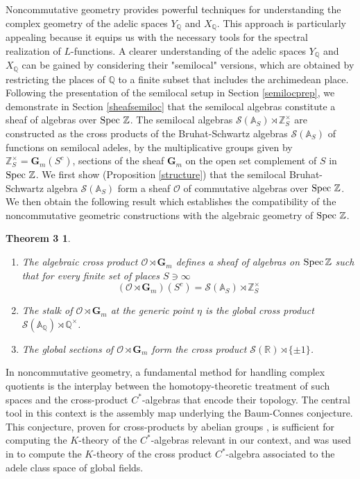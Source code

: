 \documentclass[letterpaper,11pt]{article}
\def\Spec{{\rm Spec\,}}
\def\A{{\mathbb A}}
\def\Q{{\mathbb Q}}
\def\R{\mathbb{R}}
\def\Z{\mathbb{Z}}
\def\cS{\mathcal{S}}
\def\sheaf{{\mathscr{O} }}
\theoremstyle{plain}
\newtheorem*{theorem3}{Theorem 3}
\begin{document}
Noncommutative geometry provides powerful techniques for understanding the complex geometry of the adelic spaces $ Y_\mathbb{Q} $ and $ X_\mathbb{Q} $. This approach is particularly appealing because it equips us with the necessary tools for the spectral realization of $L$-functions. A clearer understanding of the adelic spaces $ Y_\mathbb{Q} $ and $ X_\mathbb{Q} $ can be gained by considering their "semilocal" versions, which are obtained by restricting the places of $ \mathbb{Q} $ to a finite subset that includes the archimedean place.  
Following the presentation of the semilocal setup in Section \ref{semilocprep}, we demonstrate in Section \ref{sheafsemiloc} that the semilocal algebras constitute a sheaf of algebras over $\Spec\,\Z$. The semilocal algebras $\cS(\A_S)\rtimes \Z_S^\times$ are constructed as the cross products of the Bruhat-Schwartz algebras $\cS(\A_S)$ of functions on semilocal adeles, by the multiplicative groups given by $\Z_S^\times=\mathbf{G}_m(S^c)$, sections of the sheaf $\mathbf{G}_m$ on the open set complement of $S$ in $\Spec\,\Z$. We first show (Proposition \ref{structure}) that the semilocal Bruhat-Schwartz algebra $\cS(\A_S)$ form a sheaf $\sheaf$ of commutative algebras over $\Spec\,\Z$. We then obtain the following result which establishes the compatibility of the noncommutative geometric constructions with the algebraic geometry of $\Spec\,\Z$. 
\begin{theorem3}	
\label{structure1intro}  
 		\begin{enumerate}
 			\item The algebraic cross product $\sheaf\rtimes \mathbf{G}_m$ defines a sheaf  of algebras on  $\Spec\Z$ such that for every finite set of places $S\ni \infty$
 			$$
 			\left(\sheaf\rtimes \mathbf{G}_m\right)(S^c)=\cS(\A_S)\rtimes \Z_S^\times 			$$
 			\item The stalk of $\sheaf\rtimes \mathbf{G}_m$ at the generic point $\eta$ is the global cross product $\cS(\A_\Q)\rtimes \Q^\times$. 			\item The global sections of $\sheaf\rtimes \mathbf{G}_m$ form the cross product $\cS(\R)\rtimes \{\pm 1\}$.
 		\end{enumerate}
\end{theorem3}

In noncommutative geometry, a fundamental method for handling complex quotients is the interplay between the homotopy-theoretic treatment of such spaces and the cross-product $ C^*$-algebras that encode their topology. The central tool in this context is the assembly map  underlying the Baum-Connes conjecture. This conjecture, proven for cross-products by abelian groups \cite{HK}, is sufficient for computing the $K$-theory of the $C^*$-algebras relevant in our context, and was used in \cite{RM} to compute the $K$-theory of the  cross product $C^*$-algebra associated to the adele class space of global fields. 
\end{document}
